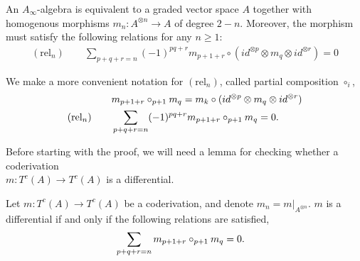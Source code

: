 \documentclass[../thesis.tex]{subfiles}
\begin{document}
        \begin{proposition}\label{prop: A-infinity def}
            An $A_\infty$-algebra is equivalent to a graded vector space $A$ together with homogenous morphisms $m_n: A^{\otimes n}\rightarrow A$ of degree $2-n$. Moreover, the morphism must satisfy the following relations for any $n\geq 1$:
            \begin{align*}
                (\text{rel}_n)\qquad \sum_{p+q+r = n}(-1)^{pq+r}m_{p+1+r}\circ (id^{\otimes p}\otimes m_q \otimes id^{\otimes r}) = 0
            \end{align*}
        \end{proposition}

        \begin{remark}
            We make a more convenient notation for $(\text{rel}_n)$, called partial composition $\circ_i$,
            \begin{align*}
                & m_{p+1+r} \circ_{p+1} m_q = m_k \circ (id^{\otimes p}\otimes m_q \otimes id^{\otimes r}) \\
                (\text{rel}_n)\qquad & \sum_{p+q+r = n} (-1)^{pq+r} m_{p+1+r} \circ_{p+1} m_q = 0\tt{.}
            \end{align*}
        \end{remark}

        Before starting with the proof, we will need a lemma for checking whether a coderivation \\ $m: T^c(A) \rightarrow T^c(A)$ is a differential.

        \begin{lemma}\label{lem: coderivation-is-diff?}
            Let $m: T^c(A) \rightarrow T^c(A)$ be a coderivation, and denote $m_n = m|_{A^{\otimes n}}$. $m$ is a differential if and only if the following relations are satisfied,
            \begin{align*}
                & \sum_{p+q+r = n}m_{p+1+r}\circ_{p+1}m_q = 0\tt{.}
            \end{align*}
        \end{lemma}
\end{document}
